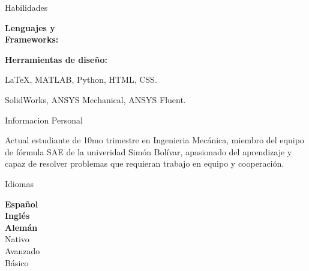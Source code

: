 \documentclass[10pt]{article}
\begin{document}
\begin{multicols}{2}

\begin{LARGE}
\color{blue!50!black}
Habilidades\par
\end{LARGE}
\begin{multicols}{2}
\textbf{Lenguajes y\\
Frameworks:}\par
\textbf{Herramientas de diseño:}\par
\hfill\par
\begin{flushleft}
LaTeX, MATLAB, Python, HTML, CSS.\par
SolidWorks, ANSYS Mechanical, ANSYS Fluent.\par
\end{flushleft}
\end{multicols}
\hfill\par
\hfill\par
\columnbreak
\begin{LARGE}
\color{blue!50!black}
Informacion Personal\par
\end{LARGE}
Actual estudiante de 10mo trimestre en Ingenieria Mecánica, miembro del equipo de fórmula SAE de la univeridad Simón Bolívar, apasionado del aprendizaje y capaz de resolver problemas que requieran trabajo en equipo y cooperación.\par
\begin{LARGE}
\color{blue!50!black}
Idiomas\par
\end{LARGE}
\begin{multicols}{3}
\textbf{Español}\\
\textbf{Inglés}\\
\textbf{Alemán}\\
Nativo\\
Avanzado\\
Básico\\
\hfill\par
\hfill\par
\end{multicols}
\end{multicols}
\end{document}
